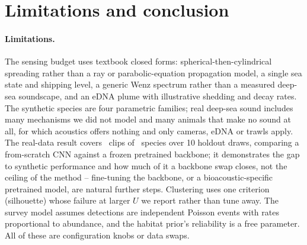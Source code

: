 \section{Limitations and conclusion}
\label{sec:conclusion}

\paragraph{Limitations.} The sensing budget uses textbook closed forms:
spherical-then-cylindrical spreading rather than a ray or parabolic-equation
propagation model, a single sea state and shipping level, a generic Wenz
spectrum rather than a measured deep-sea soundscape, and an eDNA plume with
illustrative shedding and decay rates. The synthetic species are four
parametric families; real deep-sea sound includes many mechanisms we did not
model and many animals that make no sound at all, for which acoustics offers
nothing and only cameras, eDNA or trawls apply. The real-data result covers
\RealClips\ clips of \RealSpecies\ species over 10 holdout draws, comparing
a from-scratch CNN against a frozen pretrained backbone; it demonstrates
the gap to synthetic performance and how much of it a backbone swap
closes, not the ceiling of the method -- fine-tuning the backbone, or a
bioacoustic-specific pretrained model, are natural further steps. Clustering
uses one criterion (silhouette) whose failure at larger $U$ we report rather
than tune away. The survey model assumes detections are independent Poisson
events with rates proportional to abundance, and the habitat prior's
reliability is a free parameter. All of these are configuration knobs or data
swaps.

